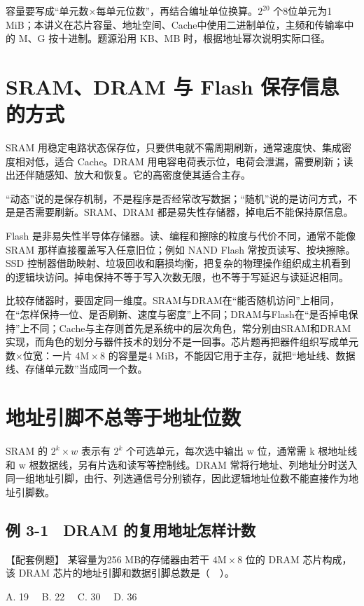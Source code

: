 容量要写成“单元数\ensuremath{\times}每单元位数”，再结合编址单位换算。\(2^{20}\) 个8位单元为1 MiB；本讲义在芯片容量、地址空间、Cache中使用二进制单位，主频和传输率中的 M、G 按十进制。题源沿用 KB、MB 时，根据地址幂次说明实际口径。

\section{SRAM、DRAM 与 Flash 保存信息的方式}\label{CO03-03}

SRAM 用稳定电路状态保存位，只要供电就不需周期刷新，通常速度快、集成密度相对低，适合 Cache。DRAM 用电容电荷表示位，电荷会泄漏，需要刷新；读出还伴随感知、放大和恢复。它的高密度使其适合主存。

``动态''说的是保存机制，不是程序是否经常改写数据；``随机''说的是访问方式，不是是否需要刷新。SRAM、DRAM 都是易失性存储器，掉电后不能保持原信息。

Flash 是非易失性半导体存储器。读、编程和擦除的粒度与代价不同，通常不能像 SRAM 那样直接覆盖写入任意旧位；例如 NAND Flash 常按页读写、按块擦除。SSD 控制器借助映射、垃圾回收和磨损均衡，把复杂的物理操作组织成主机看到的逻辑块访问。掉电保持不等于写入次数无限，也不等于写延迟与读延迟相同。

比较存储器时，要固定同一维度。SRAM与DRAM在“能否随机访问”上相同，在“怎样保持一位、是否刷新、速度与密度”上不同；DRAM与Flash在“是否掉电保持”上不同；Cache与主存则首先是系统中的层次角色，常分别由SRAM和DRAM实现，而角色的划分与器件技术的划分不是一回事。芯片题再把器件组织写成单元数\ensuremath{\times}位宽：一片 \(4\mathrm M\times8\) 的容量是4 MiB，不能因它用于主存，就把``地址线、数据线、存储单元数''当成同一个数。

\section{地址引脚不总等于地址位数}\label{CO03-04}

SRAM 的 \(2^k\times w\) 表示有 \(2^k\) 个可选单元，每次选中输出 w 位，通常需 k 根地址线和 w 根数据线，另有片选和读写等控制线。DRAM 常将行地址、列地址分时送入同一组地址引脚，由行、列选通信号分别锁存，因此逻辑地址位数不能直接作为地址引脚数。

\subsection{例 3-1　DRAM 的复用地址怎样计数}\label{CO03-05}

\begin{example}[配套例题]

【配套例题】 某容量为256 MB的存储器由若干 \(4\mathrm M\times8\) 位的 DRAM 芯片构成，该 DRAM 芯片的地址引脚和数据引脚总数是（　）。

A. 19　 B. 22　 C. 30　 D. 36

\end{example}

